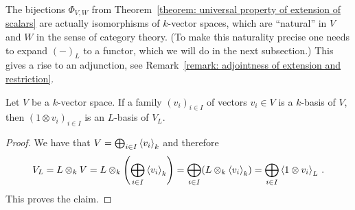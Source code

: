 \begin{remark}
  The bijections $\Phi_{V,W}$ from Theorem~\ref{theorem: universal property of extension of scalars} are actually isomorphisms of $k$-vector spaces, which are \enquote{natural} in $V$ and $W$ in the sense of category theory.
  (To make this naturality precise one needs to expand $(-)_L$ to a functor, which we will do in the next subsection.)
  This gives a rise to an adjunction, see Remark~\ref{remark: adjointness of extension and restriction}.
\end{remark}


\begin{lemma}
  \label{lemma: bases under extension of scalars}
  Let $V$ be a $k$-vector space.
  If a family $(v_i)_{i \in I}$ of vectors $v_i \in V$ is a $k$-basis of $V$, then $(1 \otimes v_i)_{i \in I}$ is an $L$-basis of $V_L$.
\end{lemma}


\begin{proof}
  We have that $V = \bigoplus_{i \in I} \left\langle v_i \right\rangle_k$ and therefore
  \[
      V_L
    = L \otimes_k V
    = L \otimes_k \left( \bigoplus_{i \in I} \left\langle v_i \right\rangle_k \right)
    = \bigoplus_{i \in I} (L \otimes_k \left\langle v_i \right\rangle_k)
    = \bigoplus_{i \in I} \left\langle 1 \otimes v_i \right\rangle_L \,.
  \]
  This proves the claim.
\end{proof}


